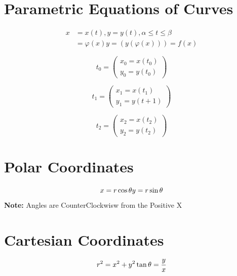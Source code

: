 \documentclass[12pt, letterpaper]{article}
\begin{document}
\section{Parametric Equations of Curves}
\begin{multicols}{2}
\begin{equation*}
\begin{split}
  x &= x(t), y=y(t), \alpha \leq t \leq \beta\\
  &= \varphi(x) y=(y(\varphi(x)))=f(x)
\end{split}
\end{equation*}

\columnbreak

\begin{equation*}
t_0 =
\begin{pmatrix}
  x_0=x(t_0)\\
  y_0=y(t_0)
\end{pmatrix}
\end{equation*}

\begin{equation*}
t_1 =
\begin{pmatrix}
  x_1 = x(t_1)\\
  y_1 = y(t+1)
\end{pmatrix}
\end{equation*}

\begin{equation*}
t_2 =
\begin{pmatrix}
  x_2 = x(t_2)\\
  y_2 = y(t_2)
\end{pmatrix}
\end{equation*}
\end{multicols}

\begin{multicols}{2}
\section{Polar Coordinates}
\begin{equation*}
  x = r \cos \theta\\
  y = r \sin \theta\\
\end{equation*}
\textbf{Note:} Angles are CounterClockwisw from the Positive X

\columnbreak

\section{Cartesian Coordinates}
\begin{equation*}
  r^2 = x^2 + y^2\\
  \tan \theta = \frac{y}{x}
\end{equation*}
\end{multicols}
\end{document}
